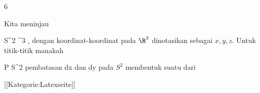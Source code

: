{6}
{

Kita meninjau

\mavergleichskette
{\vergleichskette
{ S^2
}
{ \subseteq }{ \R^3
}
{  }{
}
{    }{
}
{   }{
}
}
{}{}{,}
dengan koordinat-koordinat pada $\R^3$ dinotasikan sebagai $x,y,z$. Untuk titik-titik manakah

\mavergleichskette
{\vergleichskette
{ P
}
{ \in }{ S^2
}
{  }{
}
{    }{
}
{   }{
}
}
{}{}{}
pembatasan
\mathkor {} {dx} {dan} {dy} {}
pada $S^2$ membentuk suatu
dari


}
{} {}

 [[Kategorie:Latexseite]]
